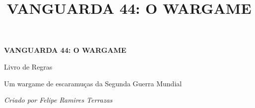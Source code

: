 \documentclass[11pt,twoside]{article}
\title{\bfseries\color{vinho}\Huge VANGUARDA 44: O WARGAME}
\author{}
\date{}
\begin{document}
\begin{titlepage}
\centering
\vspace*{3cm}
{\Huge\bfseries\color{vinho} VANGUARDA 44: O WARGAME \par}
\vspace{0.5cm}
{\Large\color{mostarda} Livro de Regras \par}
\vspace{2cm}
{\large Um wargame de escaramuças da Segunda Guerra Mundial \par}
\vspace{0.3cm}
{\large\itshape Criado por Felipe Ramires Terrazas \par}
\vfill
\end{titlepage}

\tableofcontents











\end{document}
